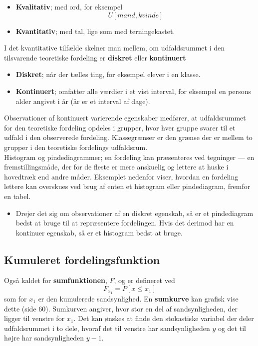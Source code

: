 \documentclass[11pt]{article}
\begin{document}
\begin{itemize}\itemsep-2pt
\item \textbf{Kvalitativ}; med ord, for eksempel
$$U[mand,kvinde]$$
\item \textbf{Kvantitativ}; med tal, lige som med terningekastet.
\end{itemize}
I det kvantitative tilfælde skelner man mellem, om udfaldsrummet i den tilsvarende teoretiske fordeling er \textbf{diskret} eller \textbf{kontinuert}
\begin{itemize}\itemsep-2pt
\item \textbf{Diskret}; når der tælles ting, for eksempel elever i en klasse.
\item \textbf{Kontinuert}; omfatter alle værdier i et vist interval, for eksempel en persons alder angivet i år (år er et interval af dage). 
\end{itemize}
Observationer af kontinuert varierende egenskaber medfører, at udfaldsrummet for den teoretiske fordeling opdeles i grupper, hvor hver gruppe svarer til et udfald i den observerede fordeling. Klassegrænser er den grænse der er mellem to grupper i den teoretiske fordelings udfaldsrum.\\[0.2cm] 
Histogram og pindediagrammer; en fordeling kan præsenteres ved tegninger --- en fremstillingsmåde, der for de fleste er mere anskuelig og lettere at huske i hovedtræk end andre måder. Eksemplet nedenfor viser, hvordan en fordeling lettere kan overskues ved brug af enten et histogram eller pindediagram, fremfor en tabel.
\begin{itemize}\itemsep-2pt
\item Drejer det sig om observationer af en diskret egenskab, så er et pindediagram bedst at bruge til at repræsentere fordelingen. Hvis det derimod har en kontinuer egenskab, så er et histogram bedst at bruge.  
\end{itemize}
\subsection{Kumuleret fordelingsfunktion}
Også kaldet for \textbf{sumfunktionen}, $F$, og er defineret ved
$$F_{x_1}=P[x\leq x_1]$$
som for $x_1$ er den kumulerede sandsynlighed. En \textbf{sumkurve} kan grafisk vise dette (side 60). Sumkurven angiver, hvor stor en del af sandsynligheden, der ligger til venstre for $x_1$. Det kan ønskes at finde den stokastiske variabel der deler udfaldsrummet i to dele, hvoraf det til venstre har sandsynligheden $y$ og det til højre har sandsynligheden $y-1$. 
\end{document}
